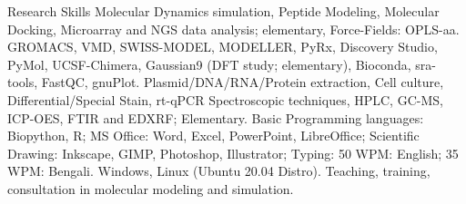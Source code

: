 
\begin{rubric}{Research Skills}
\entry*[Biophysics]
     Molecular Dynamics simulation, Peptide Modeling, Molecular Docking, Microarray and NGS data analysis; elementary, Force-Fields: OPLS-aa.
\entry*[Applications]
    GROMACS, VMD, SWISS-MODEL, MODELLER, PyRx, Discovery Studio, PyMol, UCSF-Chimera, Gaussian9 (DFT study; elementary), Bioconda, sra-tools, FastQC, gnuPlot.
\entry*[Molecular]
    Plasmid/DNA/RNA/Protein extraction, Cell culture, Differential/Special Stain, rt-qPCR
\entry*[Analytical]
    Spectroscopic techniques, HPLC, GC-MS, ICP-OES, FTIR and EDXRF; Elementary.
\entry*[Computing]
    Basic Programming languages: Biopython, R; MS Office: Word, Excel, PowerPoint, LibreOffice; Scientific Drawing: Inkscape, GIMP, Photoshop, Illustrator; Typing: 50 WPM: English; 35 WPM: Bengali.
\entry*[OS]
    Windows, Linux (Ubuntu 20.04 Distro).
\entry*[Misc.]
    Teaching, training, consultation in molecular modeling and simulation.
\end{rubric}
    